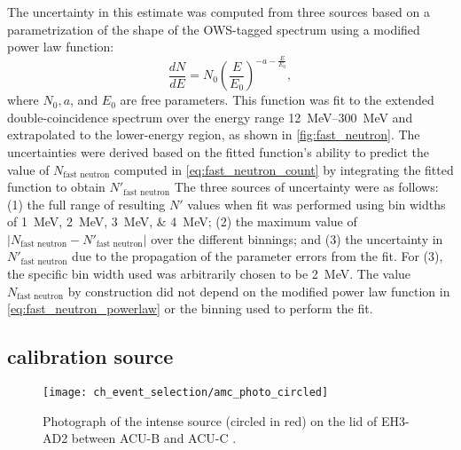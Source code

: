 The uncertainty in this estimate was computed from three sources
based on a parametri\-zation of the shape of the OWS-tagged spectrum
using a modified power law function:
\begin{equation}\label{eq:fast_neutron_powerlaw}
    \frac{dN}{dE} = N_0 \left(\frac{E}{E_0}\right)^{-a-\frac{E}{E_0}},
\end{equation}
where $N_0,a$, and $E_0$ are free parameters.
This function was fit to the extended double-coincidence spectrum
over the energy range \SIrange{12}{300}{\MeV}
and extrapolated to the lower-energy region,
as shown in \cref{fig:fast_neutron}.
The uncertainties were derived based on the fitted function's
ability to predict the value of $N_{\text{fast neutron}}$
computed in \cref{eq:fast_neutron_count}
by integrating the fitted function to obtain $N'_\text{fast neutron}$
The three sources of uncertainty were as follows:
(1) the full range of resulting $N'$ values
when fit was performed using bin widths of \SIlist{1;2;3;4}{\MeV};
(2) the maximum value of $\vert N_\text{fast neutron} - N'_\text{fast neutron}\vert$
over the different binnings;
and (3) the uncertainty in $N'_\text{fast neutron}$ due to
the propagation of the parameter errors from the fit.
For (3), the specific bin width used was arbitrarily chosen to be \SI{2}{\MeV}.
The value $N_\text{fast neutron}$ by construction did not depend
on the modified power law function in \cref{eq:fast_neutron_powerlaw}
or the binning used to perform the fit.

\subsection{\texorpdfstring{\amcbold}{Am-C} calibration source}
\label{subsec:amc}

\begin{figure}
    \centering
    \texttt{[image: ch\_event\_selection/amc\_photo\_circled]}
    \caption[Intense \amc{} source photograph]{
        Photograph of the intense \amc{} source (circled in red)
        on the lid of EH3-AD2 between ACU-B and ACU-C \cite{amc_photo}.
    }
    \label{fig:amc_photo}
\end{figure}

